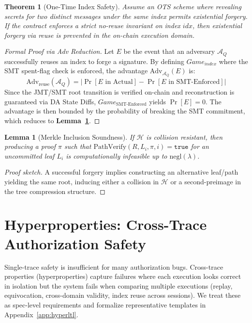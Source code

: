 \documentclass[conference]{IEEEtran}
\theoremstyle{definition}
\theoremstyle{plain}
\newtheorem{theorem}{Theorem}
\newtheorem{lemma}{Lemma}
\theoremstyle{remark}
\newcommand{\negl}{\mathrm{negl}}
\newcommand{\PathVerify}{\mathrm{PathVerify}}
\newcommand{\Hash}{\mathcal{H}}
\begin{document}
\begin{theorem}[One-Time Index Safety]
\label{thm:ots}
Assume an OTS scheme where revealing secrets for two distinct messages under the same index permits existential forgery. If the contract enforces a strict no-reuse invariant on index $idx$, then existential forgery via reuse is prevented in the on-chain execution domain.
\end{theorem}

\begin{proof}[Formal Proof via Adv Reduction]
Let $E$ be the event that an adversary $\mathcal{A}_Q$ successfully reuses an index to forge a signature. By defining $Game_{index}$ where the SMT spent-flag check is enforced, the advantage $\text{Adv}_{\mathcal{A}_Q}(E)$ is:
\[
\text{Adv}_{\text{reuse}}(\mathcal{A}_Q) = | \Pr[E \text{ in } \text{Actual}] - \Pr[E \text{ in } \text{SMT-Enforced}] |
\]
Since the JMT/SMT root transition is verified on-chain and reconstruction is guaranteed via DA State Diffs, $Game_{\text{SMT-Enforced}}$ yields $\Pr[E] = 0$. The advantage is then bounded by the probability of breaking the SMT commitment, which reduces to \textbf{Lemma~\ref{lem:merkle}}.
\end{proof}

\begin{lemma}[Merkle Inclusion Soundness]
\label{lem:merkle}
If $\Hash$ is collision resistant, then producing a proof $\pi$ such that $\PathVerify(R,L_i,\pi,i)=\texttt{true}$ for an uncommitted leaf $L_i$ is computationally infeasible up to $\negl(\lambda)$.
\end{lemma}

\begin{proof}[Proof sketch]
A successful forgery implies constructing an alternative leaf/path yielding the same root, inducing either a collision in $\Hash$ or a second-preimage in the tree compression structure.
\end{proof}

\section{Hyperproperties: Cross-Trace Authorization Safety}
Single-trace safety is insufficient for many authorization bugs. Cross-trace properties (hyperproperties) capture failures where each execution looks correct in isolation but the system fails when comparing multiple executions (replay, equivocation, cross-domain validity, index reuse across sessions). We treat these as spec-level requirements and formalize representative templates in Appendix~\ref{app:hyperltl}.
\end{document}
